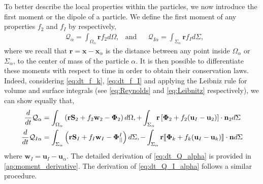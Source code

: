 To better describe the local properties within the particles, we now introduce the first moment or the dipole of a particle.
We define the first moment of any properties $f_2$ and $f_I$ by respectively,
\begin{align}
    &\mathcal{Q}_\alpha 
    = \int_{\Omega_\alpha} \textbf{r} f_2 d\Omega,
    &\text{and}&
    &\mathcal{Q}_{I\alpha}
    = \int_{\Sigma_\alpha} \textbf{r} f_I d\Sigma,
    \label{eq:first_moment_definition}
\end{align}
where we recall that $\textbf{r} = \textbf{x} - \textbf{x}_\alpha$ is the distance between any point inside $\Omega_\alpha$ or $\Sigma_\alpha$, to the center of mass of the particle $\alpha$.
It is then possible to differentiate these moments with respect to time in order to obtain their conservation laws.
Indeed, considering \ref{eq:dt_f_k}, \ref{eq:dt_f_I} and applying the Leibniz rule for volume and surface integrals (see \ref{eq:Reynolds} and \ref{eq:Leibnitz} respectively), we can show equally that,
\begin{align}
    \frac{d}{d t} \mathcal{Q}_\alpha
    &= \int_{\Omega_\alpha} \left(
        \textbf{r} \textbf{S}_2         
        + f_2  \textbf{w}_2 
        - \mathbf{\Phi}_2
    \right) d\Omega,
    + \int_{\Sigma_\alpha} \textbf{r} \left[
        \mathbf{\Phi}_2
        + f_2 (\textbf{u}_I-\textbf{u}_2)
    \right]\cdot \textbf{n}_2  d\Sigma 
    \label{eq:dt_Q_alpha}\\
    \frac{d}{d t} \mathcal{Q}_{I\alpha}
    &= \int_{\Sigma_\alpha} \left(
        \textbf{r}\textbf{S}_I
        + f_I \textbf{w}_I
        - \mathbf{\Phi}_{||}^I
    \right) d\Sigma,
    - \int_{\Sigma_\alpha}\textbf{r} \llbracket \mathbf{\Phi}_k
        + f_k (\textbf{u}_I - \textbf{u}_k)
     \rrbracket \cdot \textbf{n}
    d\Sigma
    \label{eq:dt_Q_I_alpha}
\end{align}
where $\textbf{w}_I = \textbf{u}_I - \textbf{u}_\alpha$.
The detailed derivation of \ref{eq:dt_Q_alpha} is provided in \ref{ap:moment_derivative}.
The derivation of \ref{eq:dt_Q_I_alpha} follows a similar procedure. 
